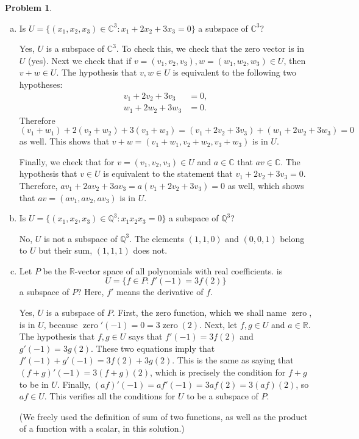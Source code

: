 \documentclass[11pt,oneside]{amsart}
\theoremstyle{definition}
\newtheorem{problem}{Problem}
\newcommand{\bC}{\mathbb{C}}
\newcommand{\bQ}{\mathbb{Q}}
\newcommand{\bR}{\mathbb{R}}
\begin{document}
    \begin{problem}
        \hfill\begin{enumerate}[(a)]
            \item Is $U=\{(x_1,x_2,x_3)\in\bC^3:x_1+2x_2+3x_3=0\}$ a subspace of $\bC^3$?
            \begin{solution}
                Yes, $U$ is a subspace of $\bC^3$. To check this, we check that the zero vector is in $U$ (yes). Next we check that if $v=(v_1,v_2,v_3),w=(w_1,w_2,w_3)\in U$, then $v+w\in U$. The hypothesis that $v,w\in U$ is equivalent to the following two hypotheses:
                \begin{align*}
                    v_1+2v_2+3v_3 &= 0,\\
                    w_1+2w_2+3w_3 &= 0.
                \end{align*}
                Therefore $(v_1+w_1)+2(v_2+w_2)+3(v_3+w_3)=(v_1+2v_2+3v_3)+(w_1+2w_2+3w_3)=0$ as well. This shows that $v+w=(v_1+w_1,v_2+w_2,v_3+w_3)$ is in $U$.

                Finally, we check that for $v=(v_1,v_2,v_3)\in U$ and $a\in \bC$ that $av\in\bC$. The hypothesis that $v\in U$ is equivalent to the statement that $v_1+2v_2+3v_3=0$. Therefore, $av_1+2av_2+3av_3=a(v_1+2v_2+3v_3)=0$ as well, which shows that $av=(av_1,av_2,av_3)$ is in $U$.
            \end{solution}
            \item Is $U=\{(x_1,x_2,x_3)\in\bQ^3:x_1x_2x_3=0\}$ a subspace of $\bQ^3$?
            \begin{solution}
                No, $U$ is not a subspace of $\bQ^3$. The elements $(1,1,0)$ and $(0,0,1)$ belong to $U$ but their sum, $(1,1,1)$ does not.
            \end{solution}
            \item Let $P$ be the $\bR$-vector space of all polynomials with real coefficients. is
            \[U=\{f\in P:f'(-1)=3f(2)\}\]
            a subspace of $P$? Here, $f'$ means the derivative of $f$.
            \begin{solution}
                Yes, $U$ is a subspace of $P$. First, the zero function, which we shall name $\operatorname{zero}$, is in $U$, because $\operatorname{zero}'(-1)=0=3\operatorname{zero}(2)$. Next, let $f,g\in U$ and $a\in \bR$. The hypothesis that $f,g\in U$ says that $f'(-1)=3f(2)$ and $g'(-1)=3g(2)$. These two equations imply that $f'(-1)+g'(-1)=3f(2)+3g(2)$. This is the same as saying that $(f+g)'(-1)=3(f+g)(2)$, which is precisely the condition for $f+g$ to be in $U$. Finally, $(af)'(-1)=af'(-1)=3af(2)=3(af)(2)$, so $af\in U$. This verifies all the conditions for $U$ to be a subspace of $P$.

                (We freely used the definition of sum of two functions, as well as the product of a function with a scalar, in this solution.)
            \end{solution}
        \end{enumerate}
    \end{problem}
\end{document}
